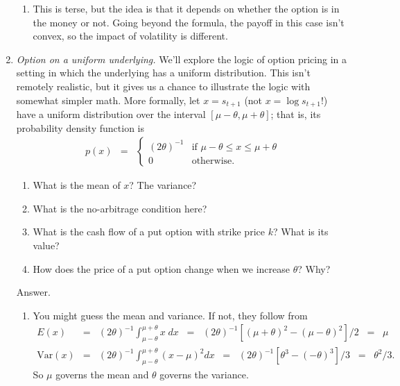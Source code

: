 \documentclass[11pt]{article}
\begin{document}
\begin{enumerate}
\begin{enumerate}
\item This is terse, but the idea is that it depends on whether
the option is in the money or not.
Going beyond the formula, the payoff in this case isn't convex,
so the impact of volatility is different.
\end{enumerate}

\item {\it Option on a uniform underlying.\/}
We'll explore the logic of option pricing in a setting in which the underlying
has a uniform distribution.
This isn't remotely realistic, but it gives us a chance to illustrate the logic with somewhat
simpler math.
More formally, let $ x = s_{t+1} $ (not $x = \log s_{t+1}$!)
have a uniform distribution over the
interval $ [\mu-\theta, \mu + \theta]$;
that is, its probability density function is
%
\begin{eqnarray*}
    p(x) &=& \left\{
            \begin{array}{ll}
            (2\theta)^{-1} & \mbox{if } \mu-\theta \leq x \leq \mu + \theta \\
            0              & \mbox{otherwise}.
            \end{array}
            \right.
\end{eqnarray*}

\smallskip
\begin{enumerate}
\item What is the mean of $x$? The variance?
\item What is the no-arbitrage condition here?
\item What is the cash flow of a put option with strike price $k$?
What is its value?
\item How does the price of a put option change when we increase $\theta$?
Why?
\end{enumerate}

Answer.
\begin{enumerate}
\item You might guess the mean and variance.  If not, they follow from
\begin{eqnarray*}
    E(x) &=& (2\theta)^{-1} \int_{\mu-\theta}^{\mu+\theta} x \; dx
            \;\;=\;\; (2\theta)^{-1} [(\mu+\theta)^2 - (\mu-\theta)^2]/2 \;\;=\;\; \mu \\
    \mbox{Var}(x) &=& (2\theta)^{-1} \int_{\mu-\theta}^{\mu+\theta} (x-\mu)^2 dx
            \;\;=\;\; (2\theta)^{-1} [\theta^3 - (-\theta)^3]/3 \;\;=\;\; \theta^2/3 .
\end{eqnarray*}
So $\mu$ governs the mean and $\theta$ governs the variance.


\end{enumerate}
\end{enumerate}
\end{document}
